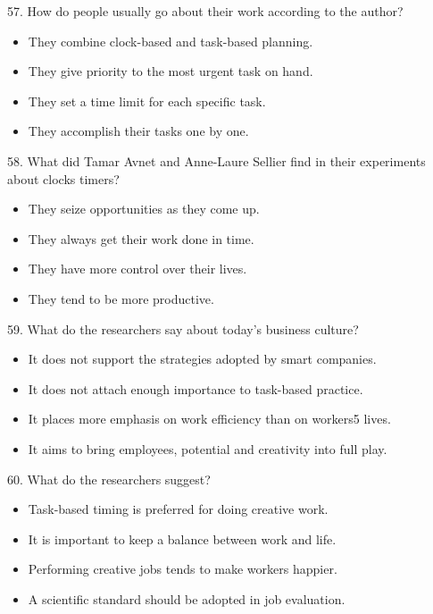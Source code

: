 \documentclass[UTF8,11pt]{ctexart}
\begin{document}
57. How do people usually go about their work according to the author?


\begin{itemize}[leftmargin=2em,itemsep=.2em,topsep=.4em]\item[A.] They combine clock-based and task-based planning.
\item[B.] They give priority to the most urgent task on hand.
\item[C.] They set a time limit for each specific task.
\item[D.] They accomplish their tasks one by one.
\end{itemize}

58. What did Tamar Avnet and Anne-Laure Sellier find in their experiments about clocks timers?


\begin{itemize}[leftmargin=2em,itemsep=.2em,topsep=.4em]\item[A.] They seize opportunities as they come up.
\item[B.] They always get their work done in time.
\item[C.] They have more control over their lives.
\item[D.] They tend to be more productive.
\end{itemize}

59. What do the researchers say about today’s business culture?


\begin{itemize}[leftmargin=2em,itemsep=.2em,topsep=.4em]\item[A.] It does not support the strategies adopted by smart companies.
\item[B.] It does not attach enough importance to task-based practice.
\item[C.] It places more emphasis on work efficiency than on workers5 lives.
\item[D.] It aims to bring employees, potential and creativity into full play.
\end{itemize}

60. What do the researchers suggest?


\begin{itemize}[leftmargin=2em,itemsep=.2em,topsep=.4em]\item[A.] Task-based timing is preferred for doing creative work.
\item[B.] It is important to keep a balance between work and life.
\item[C.] Performing creative jobs tends to make workers happier.
\item[D.] A scientific standard should be adopted in job evaluation.
\end{itemize}
\end{document}
